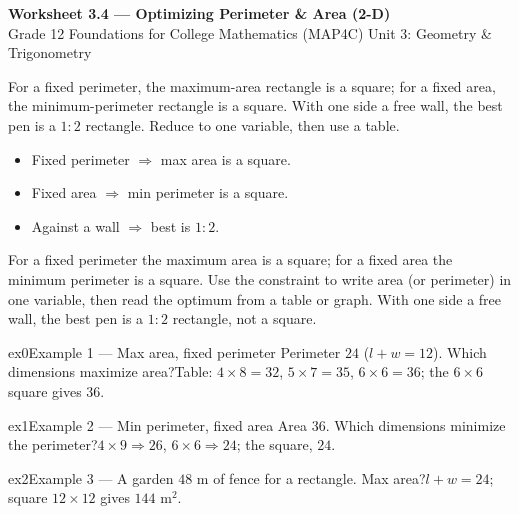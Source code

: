 \documentclass[11pt]{article}
\begin{document}
\begin{center}
{\LARGE\bfseries\color{titleblue}Worksheet 3.4 --- Optimizing Perimeter \& Area (2-D)}\\[2pt]
{\small Grade 12 Foundations for College Mathematics (MAP4C) \textperiodcentered{} Unit 3: Geometry \& Trigonometry}
\end{center}

\begin{ideabox}
For a fixed perimeter, the maximum-area rectangle is a square; for a fixed area, the minimum-perimeter rectangle is a square. With one side a free wall, the best pen is a $1{:}2$ rectangle. Reduce to one variable, then use a table.
\begin{itemize}[leftmargin=*,itemsep=2pt]
  \item Fixed perimeter $\Rightarrow$ max area is a square.
  \item Fixed area $\Rightarrow$ min perimeter is a square.
  \item Against a wall $\Rightarrow$ best is $1{:}2$.
\end{itemize}
\end{ideabox}

\begin{learnbox}
For a fixed perimeter the maximum area is a square; for a fixed area the minimum perimeter is a square.
Use the constraint to write area (or perimeter) in one variable, then read the optimum from a table or graph.
With one side a free wall, the best pen is a $1{:}2$ rectangle, not a square.
\end{learnbox}


\begin{example}{ex0}{Example 1 --- Max area, fixed perimeter}
Perimeter $24$ ($l+w=12$). Which dimensions maximize area?\soln Table: $4\times8=32$, $5\times7=35$, $6\times6=36$; the $6\times6$ square gives $36$.
\end{example}

\begin{example}{ex1}{Example 2 --- Min perimeter, fixed area}
Area $36$. Which dimensions minimize the perimeter?\soln $4\times9\Rightarrow26$, $6\times6\Rightarrow24$; the square, $24$.
\end{example}

\begin{example}{ex2}{Example 3 --- A garden}
$48$ m of fence for a rectangle. Max area?\soln $l+w=24$; square $12\times12$ gives $144$ m$^2$.
\end{example}
\end{document}

